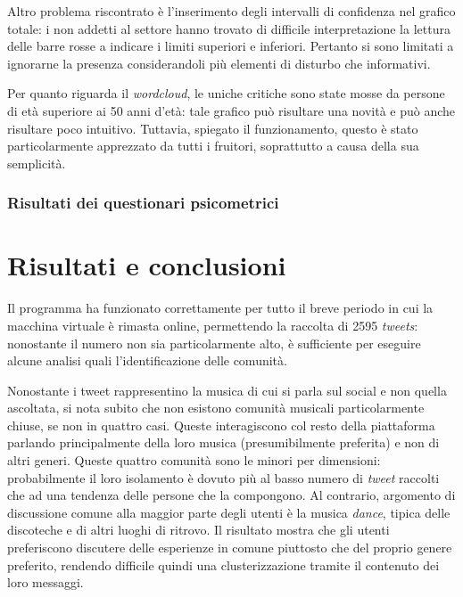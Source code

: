 \documentclass[12pt, a4paper, twocolumn]{article} %
\begin{document}
Altro problema riscontrato è l'inserimento degli intervalli di confidenza nel grafico totale: i non addetti al settore hanno trovato di difficile interpretazione la lettura delle barre rosse a indicare i limiti superiori e inferiori.
Pertanto si sono limitati a ignorarne la presenza considerandoli più elementi di disturbo che informativi.

Per quanto riguarda il \textit{wordcloud}, le uniche critiche sono state mosse da persone di età superiore ai 50 anni d'età: tale grafico può risultare una novità e può anche risultare poco intuitivo.
Tuttavia, spiegato il funzionamento, questo è stato particolarmente apprezzato da tutti i fruitori, soprattutto a causa della sua semplicità.

\section{Risultati dei questionari psicometrici}

\hfill
\newpage
\hfill
\newpage
\part{Risultati e conclusioni}
Il programma ha funzionato correttamente per tutto il breve periodo in cui la macchina virtuale è rimasta online, permettendo la raccolta di 2595 \textit{tweets}: nonostante il numero non sia particolarmente alto, è sufficiente per eseguire alcune analisi quali l'identificazione delle comunità.

Nonostante i tweet rappresentino la musica di cui si parla sul social e non quella ascoltata, si nota subito che non esistono comunità musicali particolarmente chiuse, se non in quattro casi.
Queste interagiscono col resto della piattaforma parlando principalmente della loro musica (presumibilmente preferita) e non di altri generi.
Queste quattro comunità sono le minori per dimensioni: probabilmente il loro isolamento è dovuto più al basso numero di \textit{tweet} raccolti che ad una tendenza delle persone che la compongono.
Al contrario, argomento di discussione comune alla maggior parte degli utenti è la musica \textit{dance}, tipica delle discoteche e di altri luoghi di ritrovo.
Il risultato mostra che gli utenti preferiscono discutere delle esperienze in comune piuttosto che del proprio genere preferito, rendendo difficile quindi una clusterizzazione tramite il contenuto dei loro messaggi.
\end{document}
